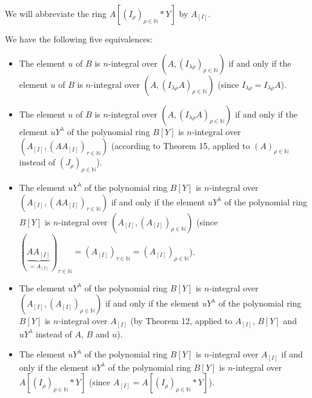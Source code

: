 \documentclass[12pt,final,notitlepage,onecolumn]{article}%
\begin{document}
We will abbreviate the ring $A\left[  \left(  I_{\rho}\right)  _{\rho
\in\mathbb{N}}\ast Y\right]  $ by $A_{\left[  I\right]  }$.

We have the following five equivalences:

\begin{itemize}
\item The element $u$ of $B$ is $n$-integral over $\left(  A,\left(
I_{\lambda\rho}\right)  _{\rho\in\mathbb{N}}\right)  $ if and only if the
element $u$ of $B$ is $n$-integral over $\left(  A,\left(  I_{\lambda\rho
}A\right)  _{\rho\in\mathbb{N}}\right)  $ (since $I_{\lambda\rho}%
=I_{\lambda\rho}A$).

\item The element $u$ of $B$ is $n$-integral over $\left(  A,\left(
I_{\lambda\rho}A\right)  _{\rho\in\mathbb{N}}\right)  $ if and only if the
element $uY^{\lambda}$ of the polynomial ring $B\left[  Y\right]  $ is
$n$-integral over $\left(  A_{\left[  I\right]  },\left(  AA_{\left[
I\right]  }\right)  _{\tau\in\mathbb{N}}\right)  $ (according to Theorem 15,
applied to $\left(  A\right)  _{\rho\in\mathbb{N}}$ instead of $\left(
J_{\rho}\right)  _{\rho\in\mathbb{N}}$).

\item The element $uY^{\lambda}$ of the polynomial ring $B\left[  Y\right]  $
is $n$-integral over $\left(  A_{\left[  I\right]  },\left(  AA_{\left[
I\right]  }\right)  _{\tau\in\mathbb{N}}\right)  $ if and only if the element
$uY^{\lambda}$ of the polynomial ring $B\left[  Y\right]  $ is $n$-integral
over $\left(  A_{\left[  I\right]  },\left(  A_{\left[  I\right]  }\right)
_{\rho\in\mathbb{N}}\right)  $ (since $\left(  \underbrace{AA_{\left[
I\right]  }}_{=A_{\left[  I\right]  }}\right)  _{\tau\in\mathbb{N}}=\left(
A_{\left[  I\right]  }\right)  _{\tau\in\mathbb{N}}=\left(  A_{\left[
I\right]  }\right)  _{\rho\in\mathbb{N}}$).

\item The element $uY^{\lambda}$ of the polynomial ring $B\left[  Y\right]  $
is $n$-integral over $\left(  A_{\left[  I\right]  },\left(  A_{\left[
I\right]  }\right)  _{\rho\in\mathbb{N}}\right)  $ if and only if the element
$uY^{\lambda}$ of the polynomial ring $B\left[  Y\right]  $ is $n$-integral
over $A_{\left[  I\right]  }$ (by Theorem 12, applied to $A_{\left[  I\right]
}$, $B\left[  Y\right]  $ and $uY^{\lambda}$ instead of $A$, $B$ and $u$).

\item The element $uY^{\lambda}$ of the polynomial ring $B\left[  Y\right]  $
is $n$-integral over $A_{\left[  I\right]  }$ if and only if the element
$uY^{\lambda}$ of the polynomial ring $B\left[  Y\right]  $ is $n$-integral
over $A\left[  \left(  I_{\rho}\right)  _{\rho\in\mathbb{N}}\ast Y\right]  $
(since $A_{\left[  I\right]  }=A\left[  \left(  I_{\rho}\right)  _{\rho
\in\mathbb{N}}\ast Y\right]  $).
\end{itemize}
\end{document}
